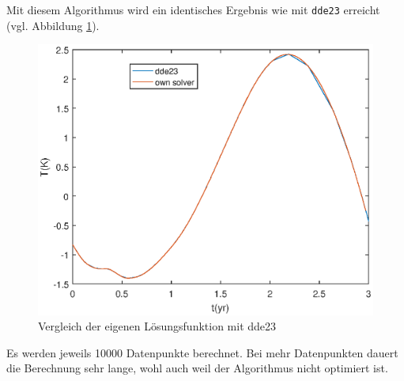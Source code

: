 Mit diesem Algorithmus wird ein identisches Ergebnis wie mit \texttt{dde23} erreicht (vgl. Abbildung \ref{fig:vgl_dde23}). 
\begin{figure}
	\centering
	\includegraphics{verzoegert/inp/figures/vgl_dde23.eps}
	\caption{Vergleich der eigenen Lösungsfunktion mit dde23}
	\label{fig:vgl_dde23}
\end{figure}
Es werden jeweils 10000 Datenpunkte berechnet. 
Bei mehr Datenpunkten dauert die Berechnung sehr lange, wohl auch weil der Algorithmus nicht optimiert ist.


